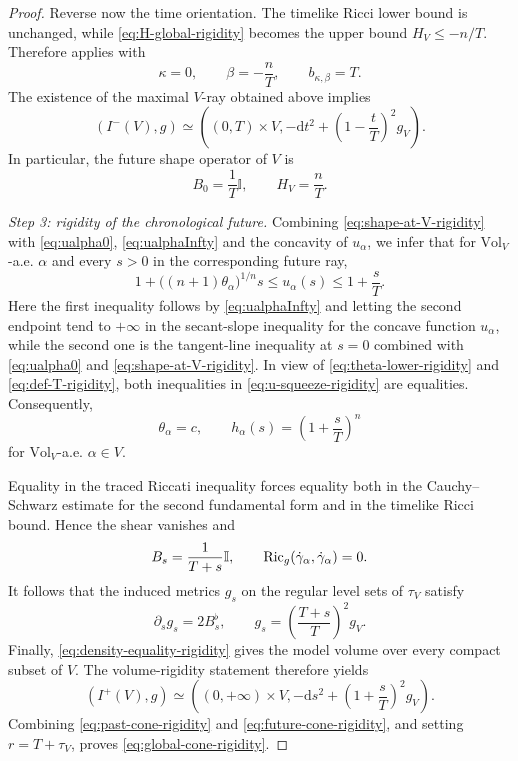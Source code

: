 \documentclass[a4paper,10pt]{article}
\newcommand{\Id}{\mathbb{I}}
\newcommand{\di}{\mathrm{d}}
\newcommand{\Ric}{{\rm Ric}}
\newcommand{\vol}{\mathrm{Vol}}
\theoremstyle{plain}
\theoremstyle{definition}
\numberwithin{equation}{section}
\begin{document}
\begin{proof}
Reverse now the time orientation. The timelike Ricci lower bound is
unchanged, while \eqref{eq:H-global-rigidity} becomes the upper bound
$H_V\leq-n/T$. Therefore
\cite[Theorem~5.12]{GrafSplitting} applies with
\[
    \kappa=0,
    \qquad \beta=-\frac nT,
    \qquad b_{\kappa,\beta}=T.
\]
The existence of the maximal $V$-ray obtained above implies
\begin{equation}\label{eq:past-cone-rigidity}
    (I^-(V),g)
    \simeq
    \left((0,T)\times V,
    -\di t^2+\left(1-\frac tT\right)^2g_V\right).
\end{equation}
In particular, the future shape operator of $V$ is
\begin{equation}\label{eq:shape-at-V-rigidity}
    B_0=\frac1T\Id,
    \qquad H_V=\frac nT.
\end{equation}

\emph{Step 3: rigidity of the chronological future.}
Combining \eqref{eq:shape-at-V-rigidity} with \eqref{eq:ualpha0}, \eqref{eq:ualphaInfty} and the concavity of $u_\alpha$, we infer that for $\vol_V$-a.e. $\alpha$ and every $s>0$ in the
corresponding future ray,
\begin{equation}\label{eq:u-squeeze-rigidity}
    1+\bigl((n+1)\theta_\alpha\bigr)^{1/n}s
    \leq u_\alpha(s)
    \leq 1+\frac sT.
\end{equation}
Here the first inequality follows by \eqref{eq:ualphaInfty} and letting the second endpoint tend
to $+\infty$ in the secant-slope inequality for the concave function
$u_\alpha$, while the second one is the tangent-line inequality at
$s=0$ combined with \eqref{eq:ualpha0} and \eqref{eq:shape-at-V-rigidity}. In view of \eqref{eq:theta-lower-rigidity} and
\eqref{eq:def-T-rigidity}, both inequalities in
\eqref{eq:u-squeeze-rigidity} are equalities. Consequently,
\begin{equation}\label{eq:density-equality-rigidity}
    \theta_\alpha=c,
    \qquad
    h_\alpha(s)=\left(1+\frac sT\right)^n
\end{equation}
for $\vol_V$-a.e. $\alpha\in V$.

Equality in the traced Riccati inequality forces equality both in
the Cauchy--Schwarz estimate for the second fundamental form and in
the timelike Ricci bound. Hence the shear vanishes and
\begin{equation}\label{eq:riccati-equality-rigidity}
    B_s=\frac1{T+s}\Id,
    \qquad
    \Ric_g(\dot\gamma_\alpha,\dot\gamma_\alpha)=0.
\end{equation}
It follows that the induced metrics $g_s$ on the regular level sets
of $\tau_V$ satisfy
\[
    \partial_s g_s=2B_s^\flat,
    \qquad
    g_s=\left(\frac{T+s}{T}\right)^2g_V.
\]
Finally, \eqref{eq:density-equality-rigidity} gives the model volume
over every compact subset of $V$. The volume-rigidity statement
\cite[Proposition~6.3]{GrafSplitting} therefore  yields
\begin{equation}\label{eq:future-cone-rigidity}
    (I^+(V),g)
    \simeq
    \left((0,+\infty)\times V,
    -\di s^2+\left(1+\frac sT\right)^2g_V\right).
\end{equation}
Combining \eqref{eq:past-cone-rigidity} and
\eqref{eq:future-cone-rigidity}, and setting $r=T+\tau_V$, proves
\eqref{eq:global-cone-rigidity}.


\end{proof}
\end{document}
